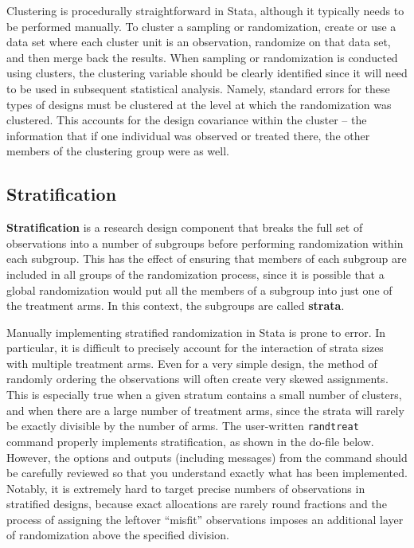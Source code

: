 Clustering is procedurally straightforward in Stata,
although it typically needs to be performed manually.
To cluster a sampling or randomization,
create or use a data set where each cluster unit is an observation,
randomize on that data set, and then merge back the results.
When sampling or randomization is conducted using clusters,
the clustering variable should be clearly identified
since it will need to be used in subsequent statistical analysis.
Namely, standard errors for these types of designs must be clustered
at the level at which the randomization was clustered.
This accounts for the design covariance within the cluster --
the information that if one individual was observed or treated there,
the other members of the clustering group were as well.

\subsection{Stratification}

\textbf{Stratification} is a research design component
that breaks the full set of observations into a number of subgroups
before performing randomization within each subgroup.
This has the effect of ensuring that members of each subgroup
are included in all groups of the randomization process,
since it is possible that a global randomization
would put all the members of a subgroup into just one of the treatment arms.
In this context, the subgroups are called \textbf{strata}.

Manually implementing stratified randomization in Stata is prone to error.
In particular, it is difficult to precisely account
for the interaction of strata sizes with multiple treatment arms.
Even for a very simple design, the method of randomly ordering the observations
will often create very skewed assignments.
This is especially true when a given stratum contains a small number of clusters,
and when there are a large number of treatment arms,
since the strata will rarely be exactly divisible by the number of arms.\cite{carril2017dealing}
The user-written \texttt{randtreat} command properly implements stratification, 
as shown in the do-file below. 
However, the options and outputs (including messages) from the command should be carefully reviewed
so that you understand exactly what has been implemented.
Notably, it is extremely hard to target precise numbers of observations
in stratified designs, because exact allocations are rarely round fractions
and the process of assigning the leftover ``misfit'' observations
imposes an additional layer of randomization above the specified division.

